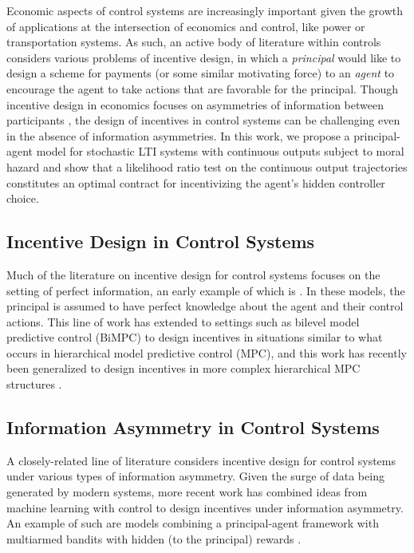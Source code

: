 \documentclass[letterpaper, 10 pt, conference]{ieeeconf}  %
\begin{document}
Economic aspects of control systems are increasingly important given the growth of applications at the intersection of economics and control, like power \cite{Tan2010,5718175} or transportation \cite{su2024incentive,11298540} systems. As such, an active body of literature within controls considers various problems of incentive design, in which a \emph{principal} would like to design a scheme for payments (or some similar motivating force) to an \emph{agent} to encourage the agent to take actions that are favorable for the principal. Though incentive design in economics focuses on asymmetries of information between participants \cite{Laffont}, the design of incentives in control systems can be challenging even in the absence of information asymmetries. In this work, we propose a principal-agent model for stochastic LTI systems with continuous outputs subject to moral hazard and show that a likelihood ratio test on the continuous output trajectories constitutes an optimal contract for incentivizing the agent's hidden controller choice.
\subsection{Incentive Design in Control Systems}

Much of the literature on incentive design for control systems focuses on the setting of perfect information, an early example of which is \cite{HO1982167}. In these models, the principal is assumed to have perfect knowledge about the agent and their control actions. This line of work has extended to settings such as bilevel model predictive control (BiMPC) \cite{mintz2018control,mintz2023behavioral} to design incentives in situations similar to what occurs in hierarchical model predictive control (MPC), and this work has recently been generalized to design incentives in more complex hierarchical MPC structures \cite{thirugnanam2025dynamic}.

\subsection{Information Asymmetry in Control Systems}

A closely-related line of literature \cite{ratliff2019perspective} considers incentive design for control systems under various types of information asymmetry. Given the surge of data being generated by modern systems, more recent work has combined ideas from machine learning with control to design incentives under information asymmetry. An example of such are models combining a principal-agent framework with multiarmed bandits with hidden (to the principal) rewards \cite{dogan2023repeated,dogan2023estimating}.
\end{document}
